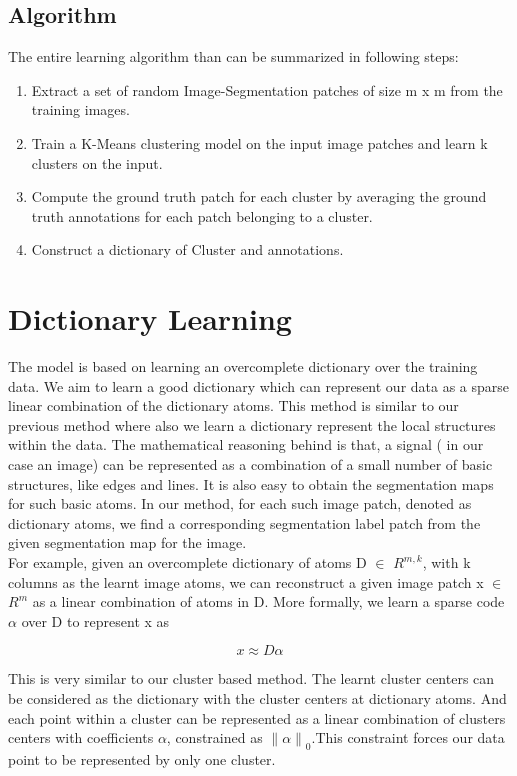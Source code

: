 \subsection{Algorithm}
The entire learning algorithm than can be summarized in following steps:
\begin{enumerate}
	\item Extract a set of random Image-Segmentation patches of size m x m from the training images.
	\item Train a K-Means clustering model on the input image patches and learn k clusters on the input.
	\item Compute the ground truth patch for each cluster by averaging the ground truth annotations for each patch belonging to a cluster. 
	\item Construct a dictionary of Cluster and annotations.
\end{enumerate}


\section{Dictionary Learning}
The model is based on learning an overcomplete dictionary over the training data. We aim to learn a good dictionary which can represent our data as a sparse linear combination of the dictionary atoms.
This method is similar to our previous method where also we learn a dictionary represent the local structures within the data. The mathematical reasoning behind is that, a signal ( in our case an image) can be represented as a combination of a small number of basic structures, like edges and lines.
It is also easy to obtain the segmentation maps for such basic atoms. In our method, for each such image patch, denoted as dictionary atoms, we find a corresponding segmentation label patch from the given segmentation map for the image.\\

For example, given an overcomplete dictionary of atoms D $\in$ $R^{m,k}$, with k columns as the learnt image atoms, we can reconstruct a given image patch x $\in$ $R^m$ as a linear combination of atoms in D. More formally, we learn a sparse code $\alpha$ over D to represent x as

$$ x \approx D \alpha $$  

This is very similar to our cluster based method. The learnt cluster centers can be considered as the dictionary with the cluster centers at dictionary atoms. And each point within a cluster can be represented as a linear combination of clusters centers with coefficients $\alpha$, constrained as ${\lVert \alpha \rVert}_0$.This constraint forces our data point to be represented by only one cluster.

